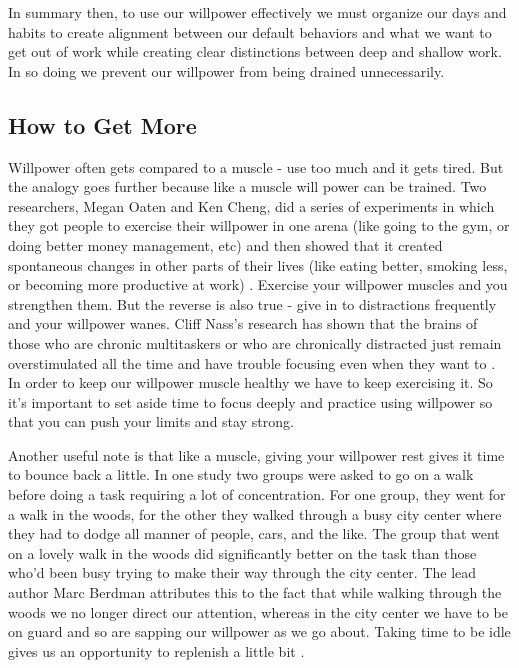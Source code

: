 \documentclass[11pt,a5paper]{book}
\begin{document}
In summary then, to use our willpower effectively we must organize our days and habits to create alignment between our default behaviors and what we want to get out of work while creating clear distinctions between deep and shallow work. In so doing we prevent our willpower from being drained unnecessarily. 

\subsection{How to Get More}
Willpower often gets compared to a muscle - use too much and it gets tired. But the analogy goes further because like a muscle will power can be trained. Two researchers, Megan Oaten and Ken Cheng, did a series of experiments in which they got people to exercise their willpower in one arena (like going to the gym, or doing better money management, etc) and then showed that it created spontaneous changes in other parts of their lives (like eating better, smoking less, or becoming more productive at work) \cite{duhigg}. Exercise your willpower muscles and you strengthen them. But the reverse is also true - give in to distractions frequently and your willpower wanes. Cliff Nass's research has shown that the brains of those who are chronic multitaskers or who are chronically distracted just remain overstimulated all the time and have trouble focusing even when they want to \cite{newport}. In order to keep our willpower muscle healthy we have to keep exercising it. So it's important to set aside time to focus deeply and practice using willpower so that you can push your limits and stay strong.
\newline

Another useful note is that like a muscle, giving your willpower rest gives it time to bounce back a little. In one study two groups were asked to go on a walk before doing a task requiring a lot of concentration. For one group, they went for a walk in the woods, for the other they walked through a busy city center where they had to dodge all manner of people, cars, and the like. The group that went on a lovely walk in the woods did significantly better on the task than those who'd been busy trying to make their way through the city center. The lead author Marc Berdman attributes this to the fact that while walking through the woods we no longer direct our attention, whereas in the city center we have to be on guard and so are sapping our willpower as we go about. Taking time to be idle gives us an opportunity to replenish a little bit \cite{newport}.
\newline
\end{document}
